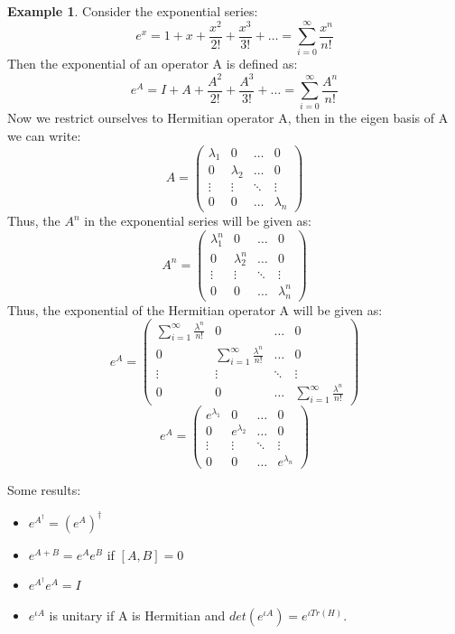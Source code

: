 \documentclass[12pt, oneside]{book}
\theoremstyle{definition}
\theoremstyle{definition}
\newtheorem{example}{Example}[section]
\theoremstyle{remark}
\begin{document}
\begin{example}
    Consider the exponential series:
    \[ e^x=1+x+\dfrac{x^2}{2!}+\dfrac{x^3}{3!}+\ldots = \sum_{i=0}^{\infty} \dfrac{x^n}{n!}\]
    Then the exponential of an operator A is defined as:
    \[ e^A=I+A+\dfrac{A^2}{2!}+\dfrac{A^3}{3!}+\ldots = \sum_{i=0}^{\infty} \dfrac{A^n}{n!}\]
    Now we restrict ourselves to Hermitian operator A, then in the eigen basis of A we can write: 
    \[ A=\begin{pmatrix} \lambda_1 & 0 & \ldots & 0 \\ 0 & \lambda_2 & \ldots & 0 \\ \vdots & \vdots & \ddots & \vdots \\ 0 & 0 & \ldots & \lambda_n \end{pmatrix} \]
    Thus, the $A^n$ in the exponential series will be given as:
    \[ A^n=\begin{pmatrix} \lambda_1^n & 0 & \ldots & 0 \\ 0 & \lambda_2^n & \ldots & 0 \\ \vdots & \vdots & \ddots & \vdots \\ 0 & 0 & \ldots & \lambda_n^n \end{pmatrix} \]
    Thus, the exponential of the Hermitian operator A will be given as:
    \[ e^A=\begin{pmatrix} \sum_{i=1}^{\infty} \frac{\lambda^n}{n!} & 0 & \ldots & 0 \\ 0 & \sum_{i=1}^{\infty} \frac{\lambda^n}{n!} & \ldots & 0 \\ \vdots & \vdots & \ddots & \vdots \\ 0 & 0 & \ldots & \sum_{i=1}^{\infty} \frac{\lambda^n}{n!} \end{pmatrix} \]
    \[ e^A = \begin{pmatrix} e^{\lambda_1} & 0 & \ldots & 0 \\ 0 & e^{\lambda_2} & \ldots & 0 \\ \vdots & \vdots & \ddots & \vdots \\ 0 & 0 & \ldots & e^{\lambda_n} \end{pmatrix} \]
\end{example}

Some results:
\begin{itemize}
    \item $e^{A^{\dagger}}=(e^A)^{\dagger}$
    \item $e^{A+B}=e^Ae^B$ if $[A,B]=0$
    \item $e^{A^{\dagger}}e^A=I$
    \item $e^{\iota A}$ is unitary if A is Hermitian and $det(e^{\iota A})= e^{\iota Tr(H)}$.
\end{itemize}
\end{document}
